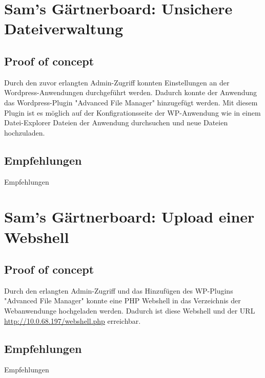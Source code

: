 
\section{\makecvssbadge Sam's Gärtnerboard: Unsichere Dateiverwaltung}

\subsection*{Proof of concept}
Durch den zuvor erlangten Admin-Zugriff konnten Einstellungen an der Wordpress-Anwendungen durchgeführt werden. Dadurch konnte der Anwendung das Wordpress-Plugin "Advanced File Manager" hinzugefügt werden. Mit diesem Plugin ist es möglich auf der Konfigrationsseite der WP-Anwendung wie in einem Datei-Explorer Dateien der Anwendung durchsuchen und neue Dateien hochzuladen. 

\subsection*{Empfehlungen}
Empfehlungen


\section{\makecvssbadge Sam's Gärtnerboard: Upload einer Webshell}

\subsection*{Proof of concept}
Durch den erlangten Admin-Zugriff und das Hinzufügen des WP-Plugins "Advanced File Manager" konnte eine PHP Webshell in das Verzeichnis der Webanwendunge hochgeladen werden. Dadurch ist diese Webshell und der URL \url{http://10.0.68.197/webshell.php} erreichbar. 

\subsection*{Empfehlungen}
Empfehlungen

